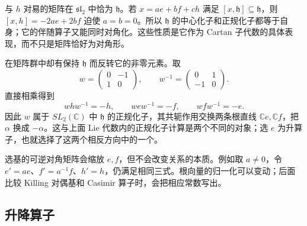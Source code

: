 \ProseParagraphBreak

与 \(h\) 对易的矩阵在 \(\mathfrak{sl}_2\) 中恰为 \(\mathfrak h\)。若 \(x=ae+bf+ch\) 满足 \([x,\mathfrak h]\subseteq\mathfrak h\)，则 \([x,h]=-2ae+2bf\) 迫使 \(a=b=0\)。所以 \(\mathfrak h\) 的中心化子和正规化子都等于自身；它的伴随算子又能同时对角化。这些性质是它作为 Cartan 子代数的具体表现，而不只是矩阵恰好为对角形。

\ProseParagraphBreak

在矩阵群中却有保持 \(\mathfrak h\) 而反转它的非零元素。取
\[
	w=\begin{pmatrix}0&-1\\1&0\end{pmatrix},\qquad
	w^{-1}=\begin{pmatrix}0&1\\-1&0\end{pmatrix}.
\]
直接相乘得到
\[
	whw^{-1}=-h,\qquad wew^{-1}=-f,\qquad wfw^{-1}=-e.
\]
因此 \(w\) 属于 \(SL_2(\mathbb C)\) 中 \(\mathfrak h\) 的正规化子，其共轭作用交换两条根直线 \(\mathbb Ce,\mathbb Cf\)，把 \(\alpha\) 换成 \(-\alpha\)。这与上面 Lie 代数内的正规化子计算是两个不同的对象；选 \(e\) 为升算子，也就选择了这两个相反方向中的一个。

\ProseParagraphBreak

选基的可逆对角矩阵会缩放 \(e,f\)，但不会改变关系的本质。例如取 \(a\ne0\)，令 \(e'=ae\)、\(f'=a^{-1}f\)、\(h'=h\)，仍满足相同三式。根向量的归一化可以变动；后面比较 Killing 对偶基和 Casimir 算子时，会把相应常数写出。

\subsection{升降算子}
\label{b5:subsec:1401:03}

